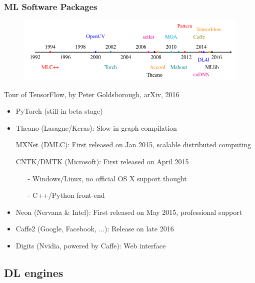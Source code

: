 
\begin{frame}
  \MyLogo
  \frametitle{ML Software Packages}  

\vskip -10pt
\begin{figure}[htbp] %
   \centering
   \includegraphics[width=0.8\linewidth]{figures/ML.pdf} 
\end{figure}
\begin{center}
\vskip -12pt
{\color{red} \scriptsize
Tour of TensorFlow, by Peter Goldsborough, arXiv, 2016}
\end{center}

	\begin{itemize}\setlength\itemsep{0.25em}\footnotesize
	\item PyTorch (still in \alert{beta} stage)
	\item Theano (Lasagne/Keras): Slow in graph compilation
	\item[\raisebox{-0.4ex}{\alert{\HandRight}}] MXNet (DMLC): First released on Jan 2015, scalable distributed computing
	\item[\raisebox{-0.4ex}{\alert{\HandRight}}] CNTK/DMTK (Microsoft): First released on April 2015
		\begin{itemize}
		\item[-] Windows/Linux, no official OS X support thought
		\item[-] C++/Python front-end
		\end{itemize}
	\item Neon (Nervana \& Intel): First released on May 2015, professional support
	\item Caffe2 (Google, Facebook, ...): Release on late 2016
	\item Digits (Nvidia, powered by Caffe): Web interface
	\end{itemize}

\end{frame}

\subsection{DL engines}


